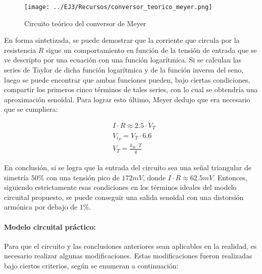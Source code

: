 \begin{figure}[H]
    \centering
    \texttt{[image: ../EJ3/Recursos/conversor\_teorico\_meyer.png]}
    \caption{Circuito te\'orico del conversor de Meyer}
    \label{fig:conversor_teorico_meyer}
\end{figure}

En forma sintetizada, se puede demostrar que la corriente que circula por la resistencia $R$ sigue un comportamiento en funci\'on de la tensi\'on de entrada que se ve descripto
por una ecuaci\'on con una funci\'on logar\'itmica. Si se calculan las series de Taylor de dicha funci\'on logar\'itmica y de la funci\'on inversa del seno,
luego se puede encontrar que ambas funciones pueden, bajo ciertas condiciones, compartir los primeros cinco t\'erminos de tales series, con lo cual se obtendr\'ia una aproximaci\'on senoidal. 
Para lograr esto \'ultimo, Meyer dedujo que era necesario que se cumpliera:

\begin{align}
    & I \cdot R \approx 2.5 \cdot V_T \\
    & V_{i_{P}} = V_T \cdot 6.6 \\
    & V_T = \frac{k_B \cdot T}{q}
\end{align}


En conclusi\'on, si se logra que la entrada del circuito sea una se\~nal triangular de simetr\'ia $50\%$ con una tensi\'on pico de $172mV$, donde $I \cdot R \approx 62.5mV$. Entonces,
siguiendo estrictamente esas condiciones en los t\'erminos ideales del modelo circuital propuesto, se puede conseguir una salida senoidal con una distorsi\'on arm\'onica por debajo de $1\%$.

\paragraph{Modelo circuital pr\'actico:} Para que el circuito y las conclusiones anteriores sean aplicables en la realidad, es necesario realizar algunas modificaciones. Estas modificaciones
fueron realizadas bajo ciertos criterios, seg\'un se enumeran a continuaci\'on:

